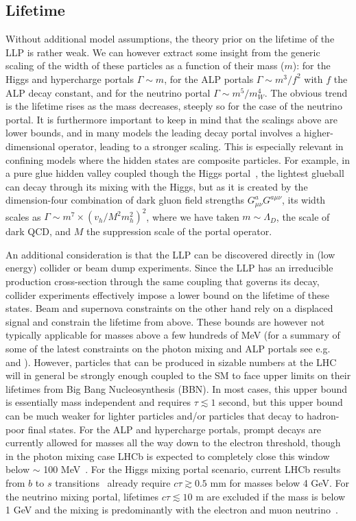 \subsection{Lifetime}
\label{sec:darkshowerctau}

Without additional model assumptions, the theory prior on the lifetime of the LLP is rather weak. We can however extract some insight from the generic scaling of the width of these particles as a function of their mass ($m$): for the Higgs and hypercharge portals $\Gamma\sim m$, for the ALP portals $\Gamma\sim m^3/f^2$ with $f$ the ALP decay constant, and for the neutrino portal $\Gamma \sim m^5/m_W^4$. The obvious trend is the lifetime rises as the mass decreases, steeply so for the case of the neutrino portal. It is furthermore important to keep in mind that the scalings above are lower bounds, and in many models the leading decay portal involves a higher-dimensional operator, leading to a stronger scaling. This is especially relevant in confining  models where the hidden states are composite particles. For example, in a pure glue hidden valley coupled though the Higgs portal~\cite{Juknevich:2009gg}, the lightest glueball can decay through its mixing with the Higgs, but as it is created by the dimension-four combination of dark gluon field strengths $G^a_{\mu\nu}G^{a \mu\nu}$, its width scales as $\Gamma\sim m^7 \times (v_h/M^2 m_h^2)^2$, where we have taken $m\sim \Lambda_D$, the scale of dark QCD, and $M$ the suppression scale of the portal operator.  

An additional consideration is that the LLP can be discovered directly in (low energy) collider or beam dump experiments. Since the LLP has an irreducible production cross-section through the same coupling that governs its decay, collider experiments effectively impose a lower bound on the lifetime of these states. Beam and supernova constraints on the other hand rely on a displaced signal and constrain the lifetime from above. These bounds are however not typically applicable for masses above a few hundreds of MeV (for a summary of some of the latest constraints on the photon mixing and ALP portals see e.g.~\cite{Ilten:2018crw} and \cite{Bauer:2017ris}).   However, particles that can be produced in sizable numbers at the LHC will in general be strongly enough coupled to the SM to face upper limits on their lifetimes from Big Bang Nucleosynthesis (BBN).   In most cases, this upper bound is essentially mass independent and requires $\tau\lesssim 1$ second, but this upper bound can be much weaker for lighter particles and/or particles that decay to hadron-poor final states.  For the ALP and hypercharge portals, prompt decays are currently allowed for masses all the way down to the electron threshold, though in the photon mixing case LHCb is expected to completely close this window below $\sim$ 100 MeV~\cite{Ilten:2015hya,Ilten:2016tkc}. For the Higgs mixing portal scenario, current LHCb results from $b$ to $s$ transitions~\cite{Aaij:2015tna,Aaij:2016qsm} already require $c\tau \gtrsim 0.5$ mm for masses below 4 GeV. For the neutrino mixing portal, lifetimes $c\tau\lesssim 10$ m are excluded if the mass is below 1 GeV and the mixing is predominantly with the electron and muon neutrino~\cite{Deppisch:2015qwa}.

